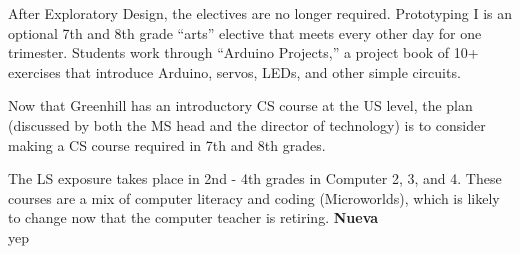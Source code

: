 After Exploratory Design, the electives are no longer required. Prototyping I is an optional 7th and 8th grade “arts” elective that meets every other day for one trimester. Students work through “Arduino Projects,” a project book of 10+ exercises that introduce Arduino, servos, LEDs, and other simple circuits. \par
Now that Greenhill has an introductory CS course at the US level, the plan (discussed by both the MS head and the director of technology) is to consider making a CS course required in 7th and 8th grades. \par
The LS exposure takes place in 2nd - 4th grades in Computer 2, 3, and 4. These courses are a mix of computer literacy and coding (Microworlds), which is likely to change now that the computer teacher is retiring.
\textbf{Nueva} \\
yep \par
